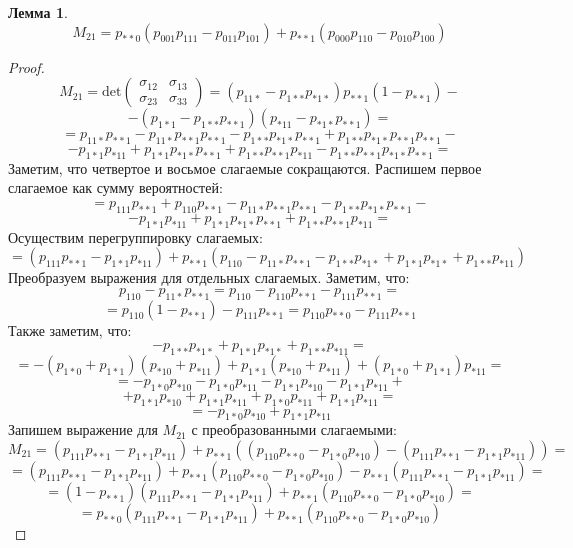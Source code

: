 \documentclass[a4paper,14pt]{extarticle}
\theoremstyle{definition}
\newtheorem{lemma}{Лемма}[section]
\begin{document}
\begin{lemma}\label{partial_cov}
    $$M_{21} = p_{**0}(p_{001}p_{111}-p_{011}p_{101}) + p_{**1} (p_{000}p_{110}-p_{010}p_{100})$$
\end{lemma}
\begin{proof}
    $$ M_{21}= \text{det}
        \begin{pmatrix}
            \sigma_{12} & \sigma_{13} \\
            \sigma_{23} & \sigma_{33}
        \end{pmatrix}
        = (p_{11*}-p_{1**}p_{*1*}) p_{**1}(1-p_{**1})-
    $$
    $$
        -(p_{1*1}-p_{1**}p_{**1})(p_{*11}-p_{*1*}p_{**1})=
    $$
    $$
        =p_{11*}p_{**1} - p_{11*}p_{**1}p_{**1} - p_{1**}p_{*1*}p_{**1} + p_{1**}p_{*1*}p_{**1}p_{**1}-
    $$
    $$
        -p_{1*1}p_{*11}+p_{1*1}p_{*1*}p_{**1}+p_{1**}p_{**1}p_{*11}-p_{1**}p_{**1}p_{*1*}p_{**1}=
    $$
    Заметим, что четвертое и восьмое слагаемые сокращаются. Распишем первое слагаемое как сумму вероятностей:
    $$
        =p_{111}p_{**1}+p_{110}p_{**1} - p_{11*}p_{**1}p_{**1} - p_{1**}p_{*1*}p_{**1} -
    $$
    $$
        -p_{1*1}p_{*11}+p_{1*1}p_{*1*}p_{**1}+p_{1**}p_{**1}p_{*11}=
    $$
    Осуществим перегруппировку слагаемых:
    $$
        =(p_{111}p_{**1}-p_{1*1}p_{*11})+p_{**1}(p_{110}-p_{11*}p_{**1} - p_{1**}p_{*1*} + p_{1*1}p_{*1*} + p_{1**}p_{*11})
    $$
    Преобразуем выражения для отдельных слагаемых.
    Заметим, что:
    $$
        p_{110}-p_{11*}p_{**1}=p_{110}-p_{110}p_{**1}-p_{111}p_{**1}=
    $$
    $$
        =p_{110}(1-p_{**1})-p_{111}p_{**1}=p_{110}p_{**0}-p_{111}p_{**1}
    $$
    Также заметим, что:
    $$
        -p_{1**}p_{*1*} + p_{1*1}p_{*1*} + p_{1**}p_{*11}=
    $$
    $$
        =-(p_{1*0}+p_{1*1})(p_{*10}+p_{*11})+p_{1*1}(p_{*10}+p_{*11}) + (p_{1*0}+p_{1*1})p_{*11}=
    $$
    $$
        =-p_{1*0}p_{*10}-p_{1*0}p_{*11}-p_{1*1}p_{*10}-p_{1*1}p_{*11}+
    $$
    $$
        +p_{1*1}p_{*10}+p_{1*1}p_{*11}+p_{1*0}p_{*11}+p_{1*1}p_{*11}=
    $$
    $$
        =-p_{1*0}p_{*10}+p_{1*1}p_{*11}
    $$
    Запишем выражение для $M_{21}$ с преобразованными слагаемыми:
    $$
        M_{21}=(p_{111}p_{**1}-p_{1*1}p_{*11})+p_{**1}((p_{110}p_{**0}-p_{1*0}p_{*10})-(p_{111}p_{**1}-p_{1*1}p_{*11}))=
    $$
    $$
        =(p_{111}p_{**1}-p_{1*1}p_{*11})+p_{**1}(p_{110}p_{**0}-p_{1*0}p_{*10})-p_{**1}(p_{111}p_{**1}-p_{1*1}p_{*11})=
    $$
    $$
        =(1-p_{**1})(p_{111}p_{**1}-p_{1*1}p_{*11})+p_{**1}(p_{110}p_{**0}-p_{1*0}p_{*10})=
    $$
    $$
        =p_{**0}(p_{111}p_{**1}-p_{1*1}p_{*11})+p_{**1}(p_{110}p_{**0}-p_{1*0}p_{*10})
    $$

\end{proof}
\end{document}

